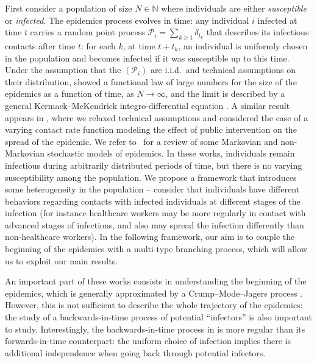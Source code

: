 \begin{refsegment}
First consider a population of size $N\in \mathbb{N}$ where
individuals are either \emph{susceptible} or \emph{infected}. The
epidemics process evolves in time: any individual $i$ infected at time
$t$ carries a random point process
$\mathcal{P}_i=\sum_{k\geq 1} \delta_{t_k}$ that describes its
infectious contacts after time $t$: for each $k$, at time $t+t_k$, an
individual is uniformly chosen in the population and becomes infected
if it was susceptible up to this time. Under the assumption that the
$(\mathcal{P}_i)$ are i.i.d.\ and technical assumptions on their
distribution, \citet{BR13} showed a functional law of large numbers
for the size of the epidemics as a function of time, as $N\to \infty$,
and the limit is described by a general Kermack--McKendrick
integro-differential equation \citep{KM27}. A similar result appears
in \citet{duchamps_general_2023}, where we relaxed technical
assumptions and considered the case of a varying contact rate function
modeling the effect of public intervention on the spread of the
epidemic. We refer to~\cite{forien2022recentadvancesepidemicmodeling}
for a review of some Markovian and non-Markovian stochastic models of
epidemics. In these works, individuals remain infectious during
arbitrarily distributed periods of time, but there is no varying
susceptibility among the population. We propose a framework that
introduces some heterogeneity in the population -- consider that
individuals have different behaviors regarding contacts with infected
individuals at different stages of the infection (for instance
healthcare workers may be more regularly in contact with advanced
stages of infections, and also may spread the infection differently
than non-healthcare workers). In the following framework, our aim is
to couple the beginning of the epidemics with a multi-type branching
process, which will allow us to exploit our main results.

An important part of these works consists in understanding the
beginning of the epidemics, which is generally approximated by a
Crump--Mode--Jagers process \citep{jagers_general_2008}. However, this
is not sufficient to describe the whole trajectory of the epidemics:
the study of a backwards-in-time process of potential
``infectors'' is also important to study. Interestingly, the
backwards-in-time process in \citet{duchamps_general_2023} is more
regular than its forwards-in-time counterpart: the uniform choice of
infection implies there is additional independence when going back
through potential infectors.


\end{refsegment}
